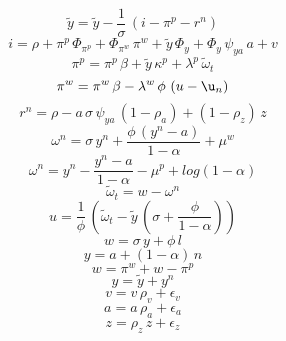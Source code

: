 \begin{dmath}
{{\tilde{y}}}={{\tilde{y}}}-\frac{1}{{{\sigma}}}\, \left({{i}}-{{\pi^p}}-{{r^n}}\right)
\end{dmath}
\begin{dmath}
{{i}}={{\rho}}+{{\pi^p}}\, {{\Phi_{\pi^p}}}+{{\Phi_{\pi^w}}}\, {{\pi^w}}+{{\tilde{y}}}\, {{\Phi_{y}}}+{{\Phi_{y}}}\, {{\psi_{ya}}}\, {{a}}+{{v}}
\end{dmath}
\begin{dmath}
{{\pi^p}}={{\pi^p}}\, {{\beta}}+{{\tilde{y}}}\, {{\kappa^p}}+{{\lambda^p}}\, {{\tilde{\omega}_t}}
\end{dmath}
\begin{dmath}
{{\pi^w}}={{\pi^w}}\, {{\beta}}-{{\lambda^w}}\, {{\phi}}\, \left({{u}}-{{\u_n}}\right)
\end{dmath}
\begin{dmath}
{{r^n}}={{\rho}}-{{a}}\, {{\sigma}}\, {{\psi_{ya}}}\, \left(1-{{\rho_a}}\right)+\left(1-{{\rho_z}}\right)\, {{z}}
\end{dmath}
\begin{dmath}
{{\omega^n}}={{\sigma}}\, {{y^n}}+\frac{{{\phi}}\, \left({{y^n}}-{{a}}\right)}{1-{{\alpha}}}+{{\mu^w}}
\end{dmath}
\begin{dmath}
{{\omega^n}}={{y^n}}-\frac{{{y^n}}-{{a}}}{1-{{\alpha}}}-{{\mu^p}}+log\left(1-{{\alpha}}\right)
\end{dmath}
\begin{dmath}
{{\tilde{\omega}_t}}={{w}}-{{\omega^n}}
\end{dmath}
\begin{dmath}
{{u}}=\frac{1}{{{\phi}}}\, \left({{\tilde{\omega}_t}}-{{\tilde{y}}}\, \left({{\sigma}}+\frac{{{\phi}}}{1-{{\alpha}}}\right)\right)
\end{dmath}
\begin{dmath}
{{w}}={{\sigma}}\, {{y}}+{{\phi}}\, {{l}}
\end{dmath}
\begin{dmath}
{{y}}={{a}}+\left(1-{{\alpha}}\right)\, {{n}}
\end{dmath}
\begin{dmath}
{{w}}={{\pi^w}}+{{w}}-{{\pi^p}}
\end{dmath}
\begin{dmath}
{{y}}={{\tilde{y}}}+{{y^n}}
\end{dmath}
\begin{dmath}
{{v}}={{v}}\, {{\rho_v}}+{{\epsilon_v}}
\end{dmath}
\begin{dmath}
{{a}}={{a}}\, {{\rho_a}}+{{\epsilon_a}}
\end{dmath}
\begin{dmath}
{{z}}={{\rho_z}}\, {{z}}+{{\epsilon_z}}
\end{dmath}
